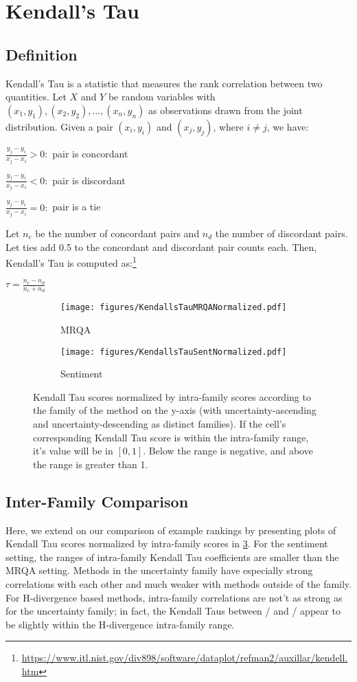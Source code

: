 \section{Kendall's Tau}
\subsection{Definition}
Kendall's Tau is a statistic that measures the rank correlation between two quantities. 
Let $X$ and $Y$ be random variables with $(x_1, y_1), (x_2, y_2), ..., (x_n, y_n)$ as observations drawn from the joint distribution. 
Given a pair $(x_i, y_i)$ and $(x_j, y_j)$, where $i\neq j$, we have:

$\frac{y_j-y_i}{x_j-x_i}>0:$ pair is concordant

$\frac{y_j-y_i}{x_j-x_i}<0:$ pair is discordant

$\frac{y_j-y_i}{x_j-x_i}=0:$ pair is a tie

Let $n_c$ be the number of concordant pairs and $n_d$ the number of discordant pairs. Let ties add 0.5 to the concordant and discordant pair counts each. Then, Kendall's Tau is computed as:\footnote{\url{https://www.itl.nist.gov/div898/software/dataplot/refman2/auxillar/kendell.htm}}

$\tau = \frac{n_c-n_d}{n_c+n_d}$

\begin{figure}[h]
\centering
\begin{subfigure}{\linewidth}
  \centering
  \texttt{[image: figures/KendallsTauMRQANormalized.pdf]}
  \caption{MRQA}
  \label{fig:sub1}
\end{subfigure}
\begin{subfigure}{\linewidth}
  \centering
  \texttt{[image: figures/KendallsTauSentNormalized.pdf]}
  \caption{Sentiment}
  \label{fig:sub2}
\end{subfigure}
\caption{Kendall Tau scores normalized by intra-family scores according to the family of the method on the y-axis (with uncertainty-ascending and uncertainty-descending as distinct families). If the cell's corresponding Kendall Tau score  is within the intra-family range, it's value will be in $[0, 1]$. Below the range is negative, and above the range is greater than 1.} 
\label{fig:kt-normalized}
\end{figure}

\subsection{Inter-Family Comparison}
Here, we extend on our comparison of example rankings by presenting plots of Kendall Tau scores normalized by intra-family scores in \ref{fig:kt-normalized}. 
For the sentiment setting, the ranges of intra-family Kendall Tau coefficients are smaller than the MRQA setting. 
Methods in the uncertainty family have especially strong correlations with each other and much weaker with methods outside of the family. 
For H-divergence based methods, intra-family correlations are not’t as strong as for the uncertainty family; in fact, the Kendall Taus between \dale{}/\knn{} and \dalt{}/\knn{} appear to be slightly within the H-divergence intra-family range. 

